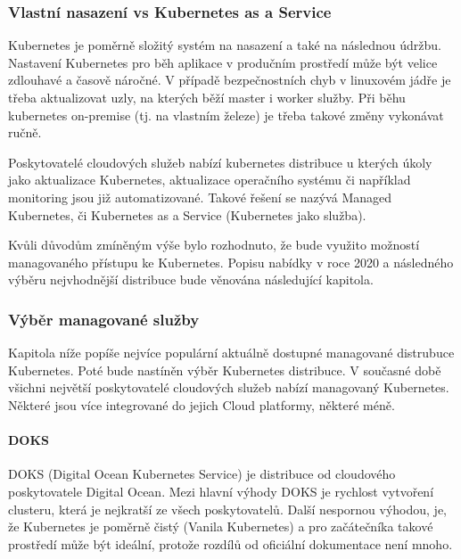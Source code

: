 \documentclass[thesis=M,czech]{FITthesis}[2019/12/23]
\theoremstyle{plain}
\theoremstyle{definition}
\begin{document}






\subsubsection{Vlastní nasazení vs Kubernetes as a Service}

Kubernetes je poměrně složitý systém na nasazení a také na následnou údržbu. Nastavení Kubernetes pro běh aplikace v produčním prostředí může být velice zdlouhavé a časově náročné. V případě bezpečnostních chyb v linuxovém jádře je třeba aktualizovat uzly, na kterých běží master i worker služby. Při běhu kubernetes on-premise (tj. na vlastním železe) je třeba takové změny vykonávat ručně.

Poskytovatelé cloudových služeb nabízí kubernetes distribuce u kterých úkoly jako aktualizace Kubernetes, aktualizace operačního systému či například monitoring jsou již automatizované. Takové řešení se nazývá Managed Kubernetes, či Kubernetes as a Service (Kubernetes jako služba). 

Kvůli důvodům zmíněným výše bylo rozhodnuto, že bude využito možností managovaného přístupu ke Kubernetes. Popisu nabídky v roce 2020 a následného výběru nejvhodnější distribuce bude věnována následující kapitola.


\subsubsection{Výběr managované služby}


Kapitola níže popíše nejvíce populární aktuálně dostupné managované distrubuce Kubernetes. Poté bude nastíněn výběr Kubernetes distribuce. V současné době všichni největší poskytovatelé cloudových služeb nabízí managovaný Kubernetes. Některé jsou více integrované do jejich Cloud platformy, některé méně. 

\paragraph{DOKS}

DOKS (Digital Ocean Kubernetes Service) je distribuce od cloudového poskytovatele Digital Ocean. Mezi hlavní výhody DOKS je rychlost vytvoření clusteru, která je nejkratší ze všech poskytovatelů. Další nespornou výhodou, je, že Kubernetes je poměrně čistý (Vanila Kubernetes) a pro začátečníka takové prostředí může být ideální, protože rozdílů od oficiální dokumentace není mnoho. 
\end{document}
